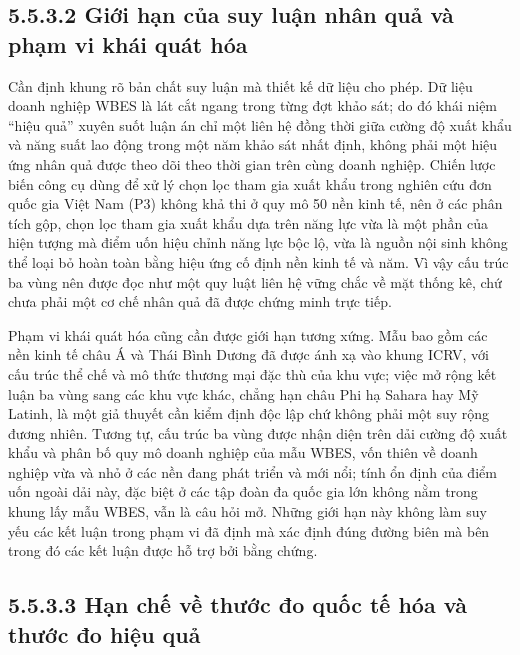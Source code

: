 \documentclass[
  a4paper,
  13pt]{extreport}
\begin{document}
\hypertarget{giux1edbi-hux1ea1n-cux1ee7a-suy-luux1eadn-nhuxe2n-quux1ea3-vuxe0-phux1ea1m-vi-khuxe1i-quuxe1t-huxf3a}{%
\subsection{5.5.3.2 Giới hạn của suy luận nhân quả và phạm vi khái quát
hóa}\label{giux1edbi-hux1ea1n-cux1ee7a-suy-luux1eadn-nhuxe2n-quux1ea3-vuxe0-phux1ea1m-vi-khuxe1i-quuxe1t-huxf3a}}

Cần định khung rõ bản chất suy luận mà thiết kế dữ liệu cho phép. Dữ
liệu doanh nghiệp WBES là lát cắt ngang trong từng đợt khảo sát; do đó
khái niệm ``hiệu quả'' xuyên suốt luận án chỉ một liên hệ đồng thời giữa
cường độ xuất khẩu và năng suất lao động trong một năm khảo sát nhất
định, không phải một hiệu ứng nhân quả được theo dõi theo thời gian trên
cùng doanh nghiệp. Chiến lược biến công cụ dùng để xử lý chọn lọc tham
gia xuất khẩu trong nghiên cứu đơn quốc gia Việt Nam (P3) không khả thi
ở quy mô 50 nền kinh tế, nên ở các phân tích gộp, chọn lọc tham gia xuất
khẩu dựa trên năng lực vừa là một phần của hiện tượng mà điểm uốn hiệu
chỉnh năng lực bộc lộ, vừa là nguồn nội sinh không thể loại bỏ hoàn toàn
bằng hiệu ứng cố định nền kinh tế và năm. Vì vậy cấu trúc ba vùng nên
được đọc như một quy luật liên hệ vững chắc về mặt thống kê, chứ chưa
phải một cơ chế nhân quả đã được chứng minh trực tiếp.

Phạm vi khái quát hóa cũng cần được giới hạn tương xứng. Mẫu bao gồm các
nền kinh tế châu Á và Thái Bình Dương đã được ánh xạ vào khung ICRV, với
cấu trúc thể chế và mô thức thương mại đặc thù của khu vực; việc mở rộng
kết luận ba vùng sang các khu vực khác, chẳng hạn châu Phi hạ Sahara hay
Mỹ Latinh, là một giả thuyết cần kiểm định độc lập chứ không phải một
suy rộng đương nhiên. Tương tự, cấu trúc ba vùng được nhận diện trên dải
cường độ xuất khẩu và phân bố quy mô doanh nghiệp của mẫu WBES, vốn
thiên về doanh nghiệp vừa và nhỏ ở các nền đang phát triển và mới nổi;
tính ổn định của điểm uốn ngoài dải này, đặc biệt ở các tập đoàn đa quốc
gia lớn không nằm trong khung lấy mẫu WBES, vẫn là câu hỏi mở. Những
giới hạn này không làm suy yếu các kết luận trong phạm vi đã định mà xác
định đúng đường biên mà bên trong đó các kết luận được hỗ trợ bởi bằng
chứng.

\hypertarget{hux1ea1n-chux1ebf-vux1ec1-thux1b0ux1edbc-ux111o-quux1ed1c-tux1ebf-huxf3a-vuxe0-thux1b0ux1edbc-ux111o-hiux1ec7u-quux1ea3}{%
\subsection{5.5.3.3 Hạn chế về thước đo quốc tế hóa và thước đo hiệu
quả}\label{hux1ea1n-chux1ebf-vux1ec1-thux1b0ux1edbc-ux111o-quux1ed1c-tux1ebf-huxf3a-vuxe0-thux1b0ux1edbc-ux111o-hiux1ec7u-quux1ea3}}
\end{document}
